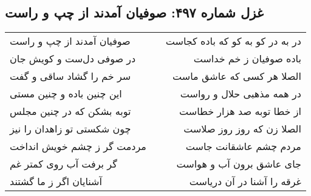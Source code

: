 \begin{center}
\section*{غزل شماره ۴۹۷: صوفیان آمدند از چپ و راست}
\label{sec:0497}
\begin{longtable}{l p{0.5cm} r}
صوفیان آمدند از چپ و راست
&&
در به در کو به کو که باده کجاست
\\
در صوفی دل‌ست و کویش جان
&&
باده صوفیان ز خم خداست
\\
سر خم را گشاد ساقی و گفت
&&
الصلا هر کسی که عاشق ماست
\\
این چنین باده و چنین مستی
&&
در همه مذهبی حلال و رواست
\\
توبه بشکن که در چنین مجلس
&&
از خطا توبه صد هزار خطاست
\\
چون شکستی تو زاهدان را نیز
&&
الصلا زن که روز روز صلاست
\\
مردمت گر ز چشم خویش انداخت
&&
مردم چشم عاشقانت جاست
\\
گر برفت آب روی کمتر غم
&&
جای عاشق برون آب و هواست
\\
آشنایان اگر ز ما گشتند
&&
غرقه را آشنا در آن دریاست
\\
\end{longtable}
\end{center}
